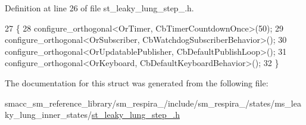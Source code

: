 Definition at line 26 of file st\+\_\+leaky\+\_\+lung\+\_\+step\+\_.\+h.


\begin{DoxyCode}
27     \{
28         configure\_orthogonal<OrTimer, CbTimerCountdownOnce>(50);
29         configure\_orthogonal<OrSubscriber, CbWatchdogSubscriberBehavior>();
30         configure\_orthogonal<OrUpdatablePublisher, CbDefaultPublishLoop>();
31         configure\_orthogonal<OrKeyboard, CbDefaultKeyboardBehavior>();
32     \}
\end{DoxyCode}


The documentation for this struct was generated from the following file\+:\begin{DoxyCompactItemize}
\item 
smacc\+\_\+sm\+\_\+reference\+\_\+library/sm\+\_\+respira\+\_/include/sm\+\_\+respira\+\_/states/ms\+\_\+leaky\+\_\+lung\+\_\+inner\+\_\+states/\hyperlink{st__leaky__lung__step__2_8h}{st\+\_\+leaky\+\_\+lung\+\_\+step\+\_.\+h}\end{DoxyCompactItemize}
